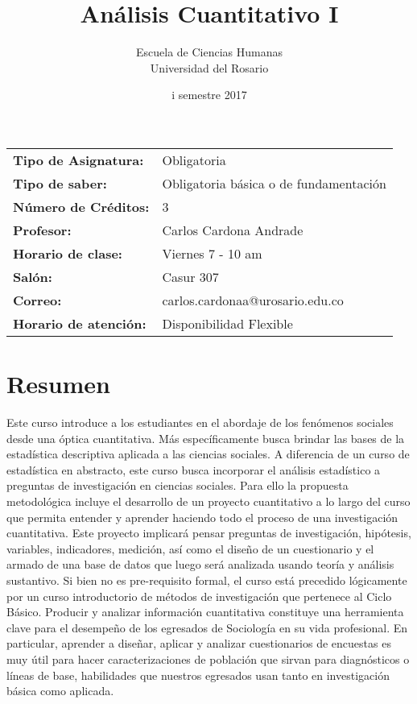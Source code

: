 \documentclass[letterpaper]{article}
\date{\vspace{-5ex}}
\begin{document}
\title{Análisis Cuantitativo I} 
\author{Escuela de Ciencias Humanas \\
	Universidad del Rosario}
\date{{\sc i} semestre 2017}

\maketitle

\begin{tabular}{ll}
		{\bf Tipo de Asignatura:} & Obligatoria \\
			{\bf Tipo de saber:} & Obligatoria básica o
			de fundamentación \\
					{\bf Número de Créditos:} & 3 \\
	{\bf Profesor:} & Carlos Cardona Andrade \\
	{\bf Horario de clase:} & Viernes 7 - 10 am \\
	{\bf Salón:} &  Casur 307  \\
	{\bf Correo:} & carlos.cardonaa@urosario.edu.co \\
	{\bf Horario de atenci\'on:} & Disponibilidad Flexible \\
\end{tabular}

\section{Resumen}
Este curso introduce a los estudiantes en el abordaje de los fenómenos sociales desde una óptica cuantitativa. Más específicamente busca brindar las bases de la estadística descriptiva aplicada a las ciencias sociales. A diferencia de un curso de estadística en abstracto, este curso busca incorporar el análisis estadístico a preguntas de investigación en ciencias sociales. Para ello la propuesta metodológica incluye el desarrollo de un proyecto cuantitativo a lo largo del curso que permita entender y aprender haciendo todo el proceso de una investigación cuantitativa. Este proyecto implicará pensar preguntas de investigación, hipótesis, variables, indicadores, medición, así como el diseño de un cuestionario y el armado de una base de datos que luego será analizada usando teoría y análisis sustantivo. Si bien no es pre-requisito formal, el curso está precedido lógicamente por un curso introductorio de métodos de investigación que pertenece al Ciclo Básico. Producir y analizar información cuantitativa constituye una herramienta clave para el desempeño de los egresados de Sociología en su vida profesional. En particular, aprender a diseñar, aplicar y analizar cuestionarios de encuestas es muy útil para hacer caracterizaciones de población que sirvan para diagnósticos o líneas de base, habilidades que nuestros egresados usan tanto en investigación básica como aplicada. 
\end{document}
